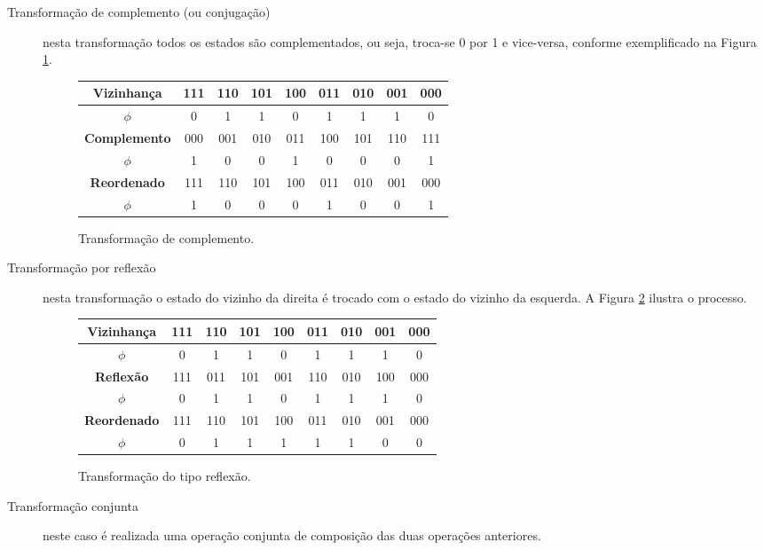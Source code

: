 \documentclass[12pt,a4paper]{article}
\begin{document}
\begin{description}

\item[Transformação de complemento (ou conjugação)] nesta transformação
todos os estados são complementados, ou seja, troca-se 0 por 1 e vice-versa,
conforme exemplificado na Figura \ref{fig:complement}.

\begin{figure}[htp]
\begin{center}
\begin{tabular}{|c|c|c|c|c|c|c|c|c|}
\hline
\textbf{Vizinhança}  & 111 & 110 & 101 & 100 & 011 & 010 & 001 & 000 \\ \hline
\textbf{$\phi$}      &  0  &  1  &  1  &  0  &  1  &  1  &  1  &  0  \\ \hline
\hline
\textbf{Complemento} & 000 & 001 & 010 & 011 & 100 & 101 & 110 & 111 \\ \hline
\textbf{$\phi$}      &  1  &  0  &  0  &  1  &  0  &  0  &  0  &  1  \\ \hline
\hline
\textbf{Reordenado}  & 111 & 110 & 101 & 100 & 011 & 010 & 001 & 000 \\ \hline
\textbf{$\phi$}      &  1  &  0  &  0  &  0  &  1  &  0  &  0  &  1  \\ \hline
\end{tabular}
\caption{Transformação de complemento.}
\label{fig:complement}
\end{center}
\end{figure}

\item[Transformação por reflexão] nesta transformação o estado do vizinho da direita é
trocado com o estado do vizinho da esquerda. A Figura \ref{fig:reflex} ilustra o processo.

\begin{figure}[htp]
\begin{center}
\begin{tabular}{|c|c|c|c|c|c|c|c|c|}
\hline
\textbf{Vizinhança}  & 111 & 110 & 101 & 100 & 011 & 010 & 001 & 000 \\ \hline
\textbf{$\phi$}      &  0  &  1  &  1  &  0  &  1  &  1  &  1  &  0  \\ \hline
\hline
\textbf{Reflexão}    & 111 & 011 & 101 & 001 & 110 & 010 & 100 & 000 \\ \hline
\textbf{$\phi$}      &  0  &  1  &  1  &  0  &  1  &  1  &  1  &  0  \\ \hline
\hline
\textbf{Reordenado}  & 111 & 110 & 101 & 100 & 011 & 010 & 001 & 000 \\ \hline
\textbf{$\phi$}      &  0  &  1  &  1  &  1  &  1  &  1  &  0  &  0  \\ \hline
\end{tabular}
\caption{Transformação do tipo reflexão.}
\label{fig:reflex}
\end{center}
\end{figure}

\newpage

\item[Transformação conjunta] neste caso é realizada uma operação
conjunta de composição das duas operações anteriores.

\end{description}
\end{document}

